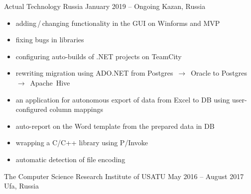 \documentclass[10pt,a4paper,ragged2e,withhyper]{altacv}
\begin{document}

\makecvheader



\begin{paracol}{2}



{Actual Technology Russia}
{January 2019 -- Ongoing}
{Kazan, Russia}

\begin{itemize}

\item adding\,/\,changing functionality in the GUI on Winforms and MVP
\smallskip

\item fixing bugs in libraries
\smallskip

\item configuring auto-builds of .NET projects on TeamCity
\smallskip

\item rewriting migration using ADO.NET
\newline from Postgres~$\rightarrow$~Oracle to Postgres~$\rightarrow$~Apache~Hive
\smallskip

\item an application for autonomous export of data from Excel to DB using user-configured column mappings
\smallskip

\item auto-report on the Word template from the prepared data in DB
\smallskip

\item wrapping a C/C++ library using P/Invoke
\smallskip

\item automatic detection of file encoding

\end{itemize}

\divider

{The Computer Science Research Institute of USATU}
{May 2016 -- August 2017}
{Ufa, Russia}


\end{paracol}
\end{document}
